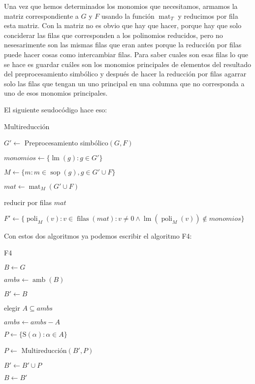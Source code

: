 \documentclass[12pt]{report}
\theoremstyle{customstyle}
\theoremstyle{factstyle}
\DeclareMathOperator{\sop}{sop}
\DeclareMathOperator{\lm}{lm}
\DeclareMathOperator{\amb}{amb}
\renewcommand{\S}{\text{S}}
\DeclareMathOperator{\mat}{mat}
\DeclareMathOperator{\poli}{poli}
\DeclareMathOperator{\filas}{filas}
\begin{document}

Una vez que hemos determinados los monomios que necesitamos, armamos la matriz correspondiente a $G$ y $F$ usando la función $\mat_T$ y reducimos por fila esta matriz. Con la matriz no es obvio que hay que hacer, porque hay que solo conciderar las filas que corresponden a los polinomios reducidos, pero no nesesarimente son las mismas filas que eran antes porque la reducción por filas puede hacer cosas como intercambiar filas. Para saber cuales son esas filas lo que se hace es guardar cuáles son los monomios principales de elementos del resultado del preprocesamiento simbólico y después de hacer la reducción por filas agarrar solo las filas que tengan un uno principal en una columna que no corresponda a uno de esos monomios principales.

El siguiente seudocódigo hace eso:

\begin{algorithm}[H] %
  \caption{Multireducción}\label{alg:Multireducción}
  $G' ←$ Preprocesamiento simbólico$(G, F)$

  $monomios ← \{\lm(g) : g ∈ G'\}$

  $M ← \{m : m ∈ \sop(g), g ∈ G' ∪ F\}$

  $mat ← \mat_M(G' ∪ F)$

  reducir por filas $mat$

  $F' ← \{\poli_M(v) : v ∈ \filas(mat) : v ≠ 0 ∧ \lm(\poli_M(v)) ∉ monomios\}$

\end{algorithm}

Con estos dos algoritmos ya podemos escribir el algoritmo F4:

\begin{algorithm}[H] %
  \caption{F4}\label{alg:F4}
  $B ← G$

  \Loop{} {
    $ambs ← \amb(B)$

    $B' ← B$

     {
      elegir $Α ⊆ ambs$

      $ambs ← ambs - Α$

      $P ← \{\S(α) : α ∈ Α\}$

      $P ←$ Multireducción$(B', P)$

      $B' ← B' ∪ P$
    }

     {
      \Break
    }

    $B ← B'$
  }

\end{algorithm}
\end{document}
